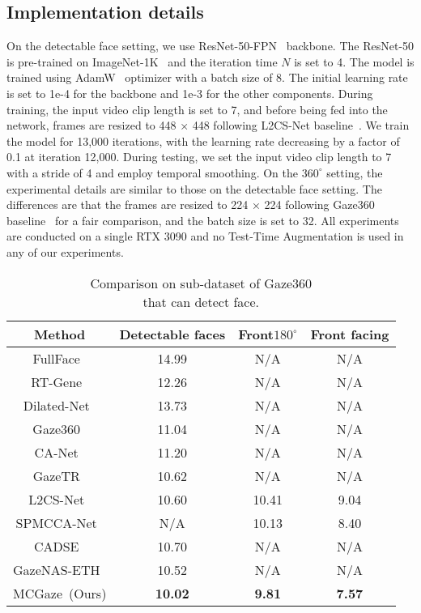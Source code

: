 \documentclass[journal]{IEEEtran}
\begin{document}
\subsection{Implementation details}
On the detectable face setting, we use ResNet-50-FPN~\cite{he2016deep,lin2017feature} backbone. 
The ResNet-50 is pre-trained on ImageNet-1K~\cite{deng2009imagenet} and the iteration time $N$ is set to 4. The model is trained using AdamW~\cite{adam} optimizer with a batch size of 8. The initial learning rate is set to 1e-4 for the backbone and 1e-3 for the other components. During training, the input video clip length is set to 7, and before being fed into the network, frames are resized to 448 × 448 following L2CS-Net baseline~\cite{abdelrahman2022l2cs}. We train the model for 13,000 iterations, with the learning rate decreasing by a factor of 0.1 at iteration 12,000. During testing, we set the input video clip length to 7 with a stride of 4 and employ temporal smoothing.
On the $360^\circ$ setting, the experimental details are similar to those on the detectable face setting. The differences are that the frames are resized to 224 × 224 following Gaze360 baseline~\cite{kellnhofer2019gaze360} for a fair comparison, and the batch size is set to 32. 
All experiments are conducted on a single RTX 3090 and no Test-Time Augmentation is used in any of our experiments.


\begin{table}[t]
\vspace{-6mm}
\setlength{\abovecaptionskip}{0cm}  \setlength{\belowcaptionskip}{-0.2cm} \caption{Comparison on sub-dataset of Gaze360\\ that can detect face.}
\centering
\tiny
\setlength{\tabcolsep}{3pt}
\begin{tabular}{c|ccc}
 \hline
Method & Detectable faces & Front$180^{\circ}$ & Front facing\\
 \hline
FullFace~\cite{zhang2017s} & 14.99 & N/A & N/A \\
RT-Gene~\cite{fischer2018rt} & 12.26 & N/A & N/A \\
Dilated-Net~\cite{chen2019appearance} & 13.73 & N/A & N/A \\
Gaze360~\cite{kellnhofer2019gaze360} & 11.04 & N/A & N/A \\
CA-Net~\cite{cheng2020coarse} & 11.20 & N/A & N/A \\
GazeTR~\cite{cheng2022gaze} & 10.62 & N/A & N/A \\
L2CS-Net~\cite{abdelrahman2022l2cs} & 10.60 & 10.41 & 9.04\\
SPMCCA-Net~\cite{yan2023gaze} & N/A & 10.13 & 8.40\\
CADSE~\cite{CADSE} & 10.70 & N/A & N/A\\
GazeNAS-ETH~\cite{NASgaze2023} & 10.52 & N/A & N/A\\
 \hline
MCGaze~(Ours) & \textbf{10.02} & \textbf{9.81} & \textbf{7.57} \\
 \hline
\end{tabular}
\label{tab: sub-dataset1}
\vspace{-4mm}
\end{table}
\end{document}
